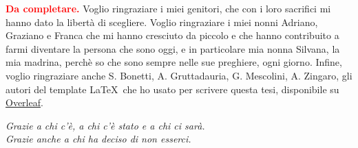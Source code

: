 \textbf{\textcolor{red}{Da completare.}}
Voglio ringraziare i miei genitori, che con i loro sacrifici mi hanno dato la libertà di scegliere. Voglio ringraziare i miei nonni Adriano, Graziano e Franca che mi hanno cresciuto da piccolo e che hanno contribuito a farmi diventare la persona che sono oggi, e in particolare mia nonna Silvana, la mia madrina, perchè so che sono sempre nelle sue preghiere, ogni giorno.
Infine, voglio ringraziare anche S. Bonetti, A. Gruttadauria, G. Mescolini, A. Zingaro, gli autori del template \LaTeX \ che ho usato per scrivere questa tesi, disponibile su \href{https://www.overleaf.com/latex/templates/classical-format-thesis-scuola-di-ingegneria-industriale-e-dellinformazione-politecnico-di-milano/dkmvtndqkyxg}{Overleaf}.

\begin{flushright}
    \begin{minipage}{0.5\textwidth}
        \small
        \textit{Grazie a chi c'è, a chi c'è stato e a chi ci sarà.\\
        Grazie anche a chi ha deciso di non esserci.}
    \end{minipage}
\end{flushright}